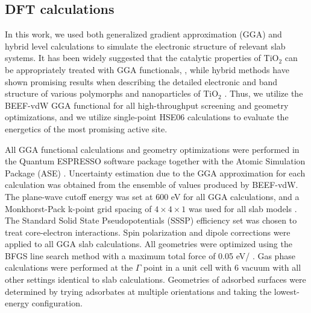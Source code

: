 \subsection{DFT calculations}
\label{sec:DFT}
In this work, we used both generalized gradient approximation (GGA) and hybrid level calculations to simulate the electronic structure of relevant slab systems. It has been widely suggested that the catalytic properties of TiO$_2$ can be appropriately treated with GGA functionals, \cite{mao_2019, Li_2018, Zheng_2016}, while hybrid methods have shown promising results when describing the detailed electronic and band structure of various polymorphs and nanoparticles of TiO$_2$ \cite{De_k_2011, Sahoo2022Ab-InitioFunctionals}. Thus, we utilize the BEEF-vdW \cite{beef} GGA functional for all high-throughput screening and geometry optimizations, and we utilize single-point HSE06 calculations to evaluate the energetics of the most promising active site.


All GGA functional calculations and geometry optimizations were performed in the Quantum ESPRESSO software package \cite{QE, 2017AdvancedESPRESSO} together with the Atomic Simulation Package (ASE) \cite{ase}. Uncertainty estimation due to the GGA approximation for each calculation was obtained from the ensemble of values produced by BEEF-vdW. The plane-wave cutoff energy was set at 600 eV for all GGA calculations, and a Monkhorst-Pack k-point grid spacing of {$4\times 4\times 1$} was used for all slab models \cite{Monkhorst_1976}. The Standard Solid State Pseudopotentials (SSSP) efficiency set \cite{GianlucaPrandini2020AEfficiency} was chosen to treat core-electron interactions. Spin polarization and dipole corrections \cite{Bengtsson_1999} were applied to all GGA slab calculations. All geometries were optimized using the BFGS line search method with a maximum total force of 0.05 eV/\text{\AA}
. Gas phase calculations were performed at the $\Gamma$ point in a unit cell with 6 \text{\AA}
 vacuum with all other settings identical to slab calculations. Geometries of adsorbed surfaces were determined by trying adsorbates at multiple orientations and taking the lowest-energy configuration.  


